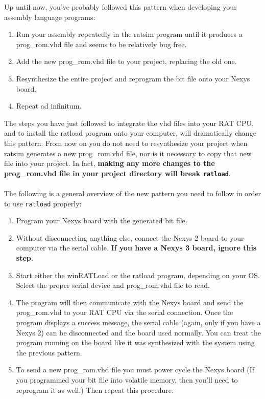\documentclass[notitlepage]{article}
\begin{document}
Up until now, you've probably followed this pattern when developing your assembly language programs:
\begin{enumerate}
\item Run your assembly repeatedly in the ratsim program until it produces a prog\_rom.vhd file and seems to be relatively bug free.
\item Add the new prog\_rom.vhd file to your project, replacing the old one.
\item Resynthesize the entire project and reprogram the bit file onto your Nexys board.
\item Repeat ad infinitum.
\end{enumerate}
The steps you have just followed to integrate the vhd files into your RAT CPU, and to install the ratload program onto your computer, will dramatically change this pattern. From now on you do not need to resynthesize your project when ratsim generates a new prog\_rom.vhd file, nor is it necessary to copy that new file into your project. In fact, \textbf{making any more changes to the prog\_rom.vhd file in your project directory will break \texttt{ratload}}.\\\\
The following is a general overview of the new pattern you need to follow in order to use \texttt{ratload} properly:

\begin{enumerate}
\item Program your Nexys board with the generated bit file.

\item Without disconnecting anything else, connect the Nexys 2 board to your computer via the serial cable. \textbf{If you have a Nexys 3 board, ignore this step.}

\item Start either the winRATLoad or the ratload program, depending on your OS. Select the proper serial device and prog\_rom.vhd file to read.

\item The program will then communicate with the Nexys board and send the prog\_rom.vhd to your RAT CPU via the serial connection. Once the program displays a success message, the serial cable (again, only if you have a Nexys 2) can be disconnected and the board used normally. You can treat the program running on the board like it was synthesized with the system using the previous pattern.

\item To send a new prog\_rom.vhd file you must power cycle the Nexys board (If you programmed your bit file into volatile memory, then you'll need to reprogram it as well.) Then repeat this procedure.
\end{enumerate}
\end{document}
